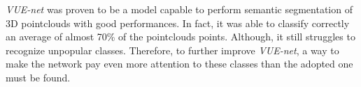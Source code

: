 \textit{VUE-net} was proven to be a model capable to perform semantic segmentation of 3D pointclouds
with good performances. In fact, it was able to classify correctly an average of almost 70\%
of the pointclouds points. Although, it still struggles to recognize unpopular classes.
Therefore, to further improve \textit{VUE-net}, a way to
make the network pay even more attention to these classes than the adopted one must be found.